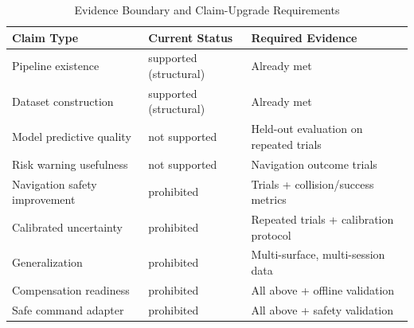 ﻿\begin{table}[htbp]
\centering
\caption{Evidence Boundary and Claim-Upgrade Requirements}
\label{tab:claim-upgrade}
\begin{tabular}{p{3.5cm}p{2.5cm}p{5cm}}
\hline
Claim Type & Current Status & Required Evidence \\
\hline
Pipeline existence & supported (structural) & Already met \\
Dataset construction & supported (structural) & Already met \\
Model predictive quality & not supported & Held-out evaluation on repeated trials \\
Risk warning usefulness & not supported & Navigation outcome trials \\
Navigation safety improvement & prohibited & Trials + collision/success metrics \\
Calibrated uncertainty & prohibited & Repeated trials + calibration protocol \\
Generalization & prohibited & Multi-surface, multi-session data \\
Compensation readiness & prohibited & All above + offline validation \\
Safe command adapter & prohibited & All above + safety validation \\
\hline
\end{tabular}
\end{table}
